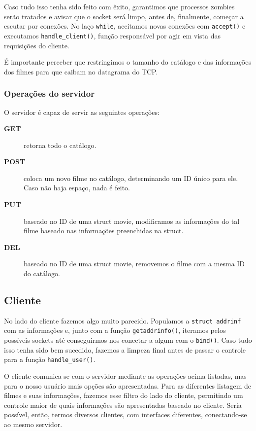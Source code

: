 \documentclass[11pt]{article}
\theoremstyle{definition}
\theoremstyle{definition}
\theoremstyle{remark}
\theoremstyle{remark}
\theoremstyle{remark}
\theoremstyle{remark}
\theoremstyle{definition}
\begin{document}
Caso tudo isso tenha sido feito com êxito, garantimos que processos zombies serão tratados e avisar que o socket será limpo, antes de, finalmente, começar a escutar por conexões. No laço \texttt{while}, aceitamos novas conexões com \texttt{accept()} e executamos \texttt{handle\_client()}, função responsável por agir em vista das requisições do cliente.

É importante perceber que restringimos o tamanho do catálogo e das informações dos filmes para que caibam no datagrama do TCP.

\subsubsection*{Operações do servidor}
\label{sec:org13c9679}
O servidor é capaz de servir as seguintes operações:
\begin{description}
\item[{\textbf{GET}}] retorna todo o catálogo.
\item[{\textbf{POST}}] coloca um novo filme no catálogo, determinando um ID único para ele. Caso não haja espaço, nada é feito.
\item[{\textbf{PUT}}] baseado no ID de uma struct movie, modificamos as informações do tal filme baseado nas informações preenchidas na struct.
\item[{\textbf{DEL}}] baseado no ID de uma struct movie, removemos o filme com a mesma ID do catálogo.
\end{description}


\subsection*{Cliente}
\label{sec:org90e5917}
No lado do cliente fazemos algo muito parecido. Populamos a \texttt{struct addrinf} com as informações e, junto com a função \texttt{getaddrinfo()}, iteramos pelos possíveis sockets até conseguirmos nos conectar a algum com o \texttt{bind()}. Caso tudo isso tenha sido bem sucedido, fazemos a limpeza final antes de passar o controle para a função \texttt{handle\_user()}.

O cliente comunica-se com o servidor mediante as operações acima listadas, mas para o nosso usuário mais opções são apresentadas. Para as diferentes listagem de filmes e suas informações, fazemos esse filtro do lado do cliente, permitindo um controle maior de quais informações são apresentadas baseado no cliente. Seria possível, então, termos diversos clientes, com interfaces diferentes, conectando-se ao mesmo servidor.
\end{document}
